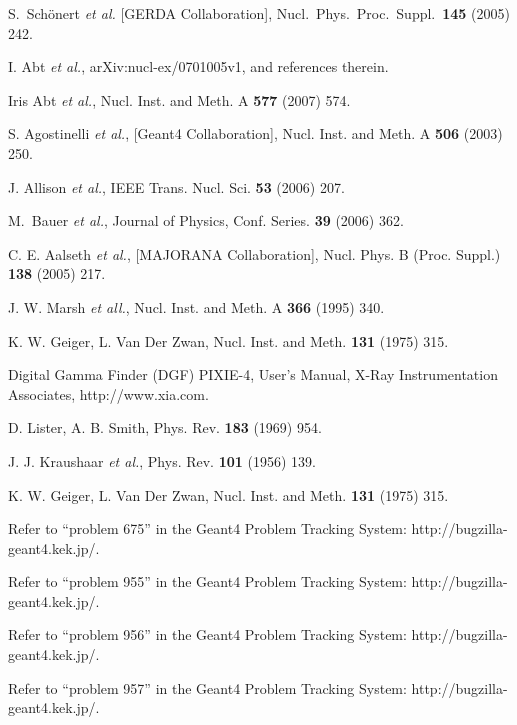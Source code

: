 \documentclass{elsart}
\begin{document}
\begin{thebibliography}{00}




 S.~Sch\"onert {\it et al.} [GERDA Collaboration],
  Nucl.\ Phys.\ Proc.\ Suppl.\ {\bf 145} (2005) 242.

 I. Abt {\it et al.}, arXiv:nucl-ex/0701005v1, and
  references therein.

 Iris Abt {\it et al.}, Nucl. Inst. and Meth. A
  {\bf 577} (2007) 574.

 S. Agostinelli {\it et al.}, [Geant4 Collaboration],
  Nucl. Inst. and Meth. A {\bf 506} (2003) 250.

 J. Allison {\it et al.}, IEEE Trans. Nucl. Sci. {\bf 53}
  (2006) 207.

 M.~Bauer {\it et al.}, Journal of Physics,
  Conf. Series.  {\bf 39} (2006) 362.

 C. E. Aalseth {\it et al.}, [MAJORANA Collaboration],
  Nucl. Phys. B (Proc. Suppl.) {\bf 138} (2005) 217.

 J. W. Marsh {\it et all.}, Nucl. Inst. and Meth. A
  {\bf 366} (1995) 340.

 K. W. Geiger, L. Van Der Zwan, Nucl. Inst. and Meth.
  {\bf 131} (1975) 315.

 Digital Gamma Finder (DGF) PIXIE-4, User’s Manual, X-Ray
  Instrumentation Associates, http://www.xia.com.


 D. Lister, A. B. Smith, Phys. Rev. {\bf 183} (1969)
  954.

 J. J. Kraushaar {\it et al.}, Phys. Rev. {\bf 101}
  (1956) 139.


 K. W. Geiger, L. Van Der Zwan, Nucl. Inst. and
  Meth. {\bf 131} (1975) 315.

\note Refer to ``problem 675'' in the Geant4 Problem
  Tracking System: http://bugzilla-geant4.kek.jp/.

\note Refer to ``problem 955'' in the Geant4 Problem
  Tracking System: http://bugzilla-geant4.kek.jp/.

\note Refer to ``problem 956'' in the Geant4 Problem
  Tracking System: http://bugzilla-geant4.kek.jp/.

\note Refer to ``problem 957'' in the Geant4 Problem
  Tracking System: http://bugzilla-geant4.kek.jp/.


\end{thebibliography}
\end{document}
